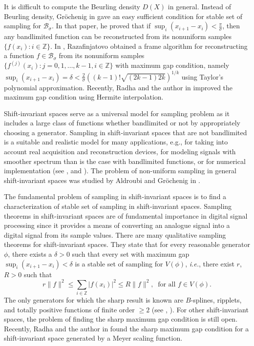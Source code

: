 \documentclass[a4paper,12pt,reqno]{amsart}
\theoremstyle{plain}
\numberwithin{equation}{section}
\theoremstyle{definition}
\newcounter {own}
\begin{document}
It is difficult to compute the Beurling density $D(X)$ in general. Instead of Beurling density, Gr\"{o}chenig  in \cite{Grochenig} gave an easy sufficient condition for stable set of sampling for $\mathcal{B}_\sigma$.
In that paper, he proved that if $\sup_{i}(x_{i+1}-x_i)<\tfrac{\pi}{\sigma}$, then any bandlimited function  can be reconstructed from its nonuniform samples $\{f(x_i) :i\in\mathbb{Z}\}$.
In \cite{Raza}, Razafinjatovo obtained a frame algorithm for reconstructing a function $f\in \mathcal{B}_\sigma$ from its nonuniform samples $\{f^{(j)}(x_i):j=0,1,\dots, k-1, i\in\mathbb{Z}\}$ 
with maximum gap condition, namely  $\sup_{i}(x_{i+1}-x_i)=\delta<\frac{2}{\sigma}((k-1)!\sqrt{(2k-1)2k})^{1/k}$ using Taylor's polynomial approximation. Recently, Radha and the author in \cite{AntoRad2}
improved the  maximum gap condition using Hermite interpolation.

Shift-invariant spaces serve as a universal model for sampling problem as it includes a large class of functions whether bandlimited or not by appropriately choosing a generator. 
Sampling in shift-invariant spaces that are not bandlimited is a suitable and realistic model for many applications, e.g., for taking into account real acquisition and
reconstruction devices, for modeling signals with smoother spectrum than is the case
with bandlimited functions, or for numerical implementation (see \cite{AlUnser}, \cite{FeiGr} and \cite{UnserAl}). 
The problem of non-uniform sampling in general shift-invariant spaces was studied by Aldroubi and Gr\"{o}chenig in \cite{AlGr2}. 
 

The fundamental problem of sampling in shift-invariant spaces is to find a characterization of stable set of sampling in shift-invariant spaces.
Sampling theorems in shift-invariant spaces are of fundamental importance in digital signal processing since it provides a means of converting an analogue signal into a digital signal from its sample values.
There are many qualitative sampling theorems for shift-invariant spaces. They state that for every reasonable generator $\phi$, there  exists  a $\delta>0$
such  that  every  set  with  maximum gap $\sup_{i}(x_{i+1}-x_i)<\delta$ is a stable set of sampling for $V(\phi)$, 
\textit{i.e.}, there exist $r$, $R>0$ such that
\begin{equation*}
r\|f\|^2\leq\sum_{i\in\mathbb{Z}}|f(x_{i})|^2\leq R\|f\|^2,~\textrm{~for~all~} f\in V(\phi).
\end{equation*}
The only generators for which the sharp result is known are $B$-splines, ripplets, and
totally positive functions of finite order $\geq 2$ (see \cite{AlGr1}, \cite{Grochenig3}). 
For other shift-invariant spaces, the problem of finding the sharp maximum gap condition is still open. 
Recently, Radha and the author in \cite{AntoRad3} found the sharp maximum gap condition for a shift-invariant space generated by a Meyer scaling function.
\end{document}
